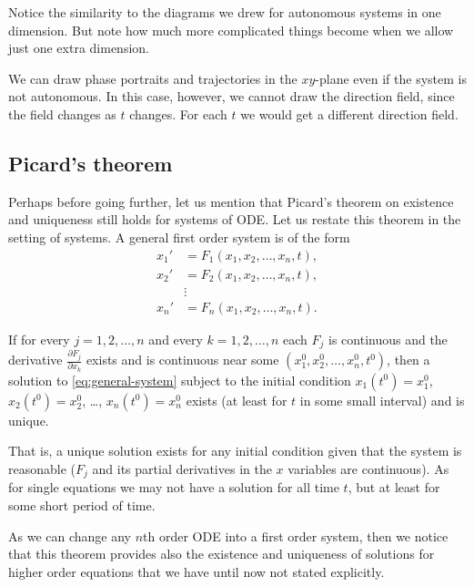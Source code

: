 Notice the similarity to the diagrams we drew for autonomous systems in one
dimension.  But note how much more complicated things become when we
allow just one extra dimension.

We can draw phase portraits and trajectories in the $xy$-plane
even if the system is not autonomous.  In this case, however, we cannot draw
the direction field, since the field changes as $t$ changes.  For
each $t$ we would get a different direction field.

\subsection{Picard's theorem}

Perhaps before going further, let us mention that Picard's theorem on
existence and uniqueness still holds for systems of ODE\@.  Let us restate
this theorem in the setting of systems.  A general first order
system is of the form
\begin{equation} \label{eq:general-system}
\begin{aligned}
x_1' & = F_1(x_1,x_2,\ldots,x_n,t) , \\
x_2' & = F_2(x_1,x_2,\ldots,x_n,t) , \\
& \vdots \\
x_n' & = F_n(x_1,x_2,\ldots,x_n,t) .
\end{aligned}
\end{equation}

\begin{theorem}%
\label{sys:picardthm}%
If for every $j=1,2,\ldots,n$ and every
$k = 1,2,\ldots,n$
each $F_j$ is continuous
and the derivative
$\frac{\partial F_j}{\partial x_k}$ exists and is
continuous near some $(x_1^0,x_2^0,\ldots,x_n^0,t^0)$, then a solution to
\eqref{eq:general-system}
subject to the initial condition
$x_1(t^0) = x_1^0$,
$x_2(t^0) = x_2^0$, \ldots,
$x_n(t^0) = x_n^0$
exists (at least for $t$ in some small interval) and is unique.
\end{theorem}

That is, a unique solution exists for any initial condition
given that the system is reasonable ($F_j$ and its partial derivatives
in the $x$ variables are continuous).  As for single equations
we may not have a solution for all time $t$, but at least for some 
short period of time.

As we can change any $n$th order ODE into a first order system,
then we notice that this theorem provides also the
existence and uniqueness of solutions for higher order equations
that we have until now not stated explicitly.

